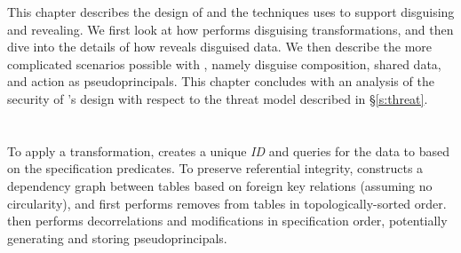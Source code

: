 This chapter describes the design of \sys and the techniques \sys uses to
support disguising and revealing. We first look at how \sys performs disguising
transformations, and then dive into the details of how \sys reveals disguised
data.
We then describe the more complicated scenarios possible with \sys, namely
disguise composition, shared data, and action as pseudoprincipals.  This chapter
concludes with an analysis of the security of \sys's design with respect to the
threat model described in \S\ref{s:threat}.

\section{\Xxing}
\label{s:applying}

To apply a \xxing transformation, \sys creates a unique \emph{\xx ID} and
queries for the data to \xx based on the \xx specification predicates.
%
To preserve referential integrity, \sys constructs a dependency graph between
tables based on foreign key relations (assuming no circularity), and first
performs removes from tables in topologically-sorted order.  \sys then performs
decorrelations and modifications in specification order, potentially generating
and storing pseudoprincipals.
%

%
%

